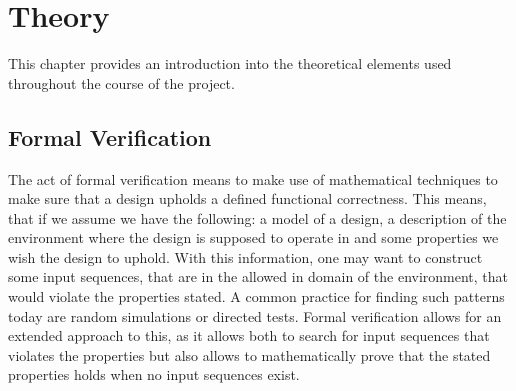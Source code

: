 \chapter{Theory}


This chapter provides an introduction into the theoretical elements used throughout the course of the project. 




\section{Formal Verification}

The act of formal verification means to make use of mathematical techniques to make sure that a design upholds a defined functional correctness.\cite{bjesse2005formal}
This means, that if we assume we have the following: a model of a design, a description of the environment where the design is supposed to operate in and some properties we wish the design to uphold. With this information, one may want to construct some input sequences, that are in the allowed in domain of the environment, that would violate the properties stated. A common practice for finding such patterns today are random simulations or directed tests.
Formal verification allows for an extended approach to this, as it allows both to search for input sequences that violates the properties but also allows to mathematically prove that the stated properties holds when no input sequences exist.

